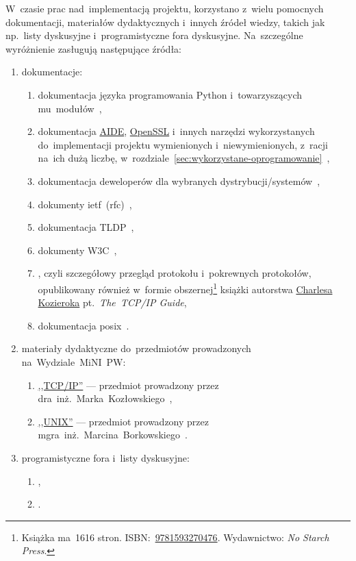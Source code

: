\documentclass[thesis]{subfiles}
\begin{document}
W~czasie prac nad~implementacją projektu, korzystano z~wielu pomocnych dokumentacji, materiałów dydaktycznych i~innych źródeł wiedzy, takich jak np.~listy dyskusyjne i~programistyczne fora dyskusyjne. Na~szczególne wyróżnienie zasługują następujące źródła:\mynobreakpar
\begin{enumerate}
	\item dokumentacje:\mynobreakpar
	\begin{enumerate}
		\item dokumentacja języka  programowania Python i~towarzyszących mu~modułów~\cite{python-doc},%
		\item dokumentacja \hyperref[sec:aide]{AIDE}, \href{https://en.wikipedia.org/wiki/OpenSSL}{OpenSSL} i~innych narzędzi wykorzystanych do~implementacji projektu wymienionych i~niewymienionych, z~racji na~ich dużą liczbę, w~rozdziale~\ref{sec:wykorzystane-oprogramowanie}~\cite{openssl-doc},
		\item dokumentacja deweloperów dla wybranych dystrybucji/systemów~\cite{archlinux-wiki,gentoo-wiki},
		\item dokumenty \gls{ietf}~(\gls{rfc})~\cite{rfc-editor},
		\item dokumentacja TLDP~\cite{tldp},
		\item dokumenty W3C~\cite{w3c},
		\item {}, czyli szczegółowy przegląd protokołu  i~pokrewnych protokołów, opublikowany również w~formie obszernej\footnote{Książka ma~1616 stron. ISBN:~\href{https://www.nostarch.com/tcpip.htm}{9781593270476}. Wydawnictwo: \emph{No Starch Press}.} książki autorstwa \href{https://www.linkedin.com/in/charles-kozierok-708112/}{\mbox{Charlesa} \mbox{Kozieroka}} pt.~\emph{The~TCP/IP Guide},
		\item dokumentacja \gls{posix}~\cite{posix}.
	\end{enumerate}
	\item materiały dydaktyczne do~przedmiotów prowadzonych na~Wydziale~MiNI~PW:\mynobreakpar
	\begin{enumerate}
		\item \href{http://www.mini.pw.edu.pl/~kozlowsm/tcpip}{,,TCP/IP''} --- przedmiot prowadzony przez dra~inż.~Marka~Kozłowskiego~\cite{kozlowski},
		\item \href{http://www.mini.pw.edu.pl/~marcinbo/strona/glowna/unix.html}{,,UNIX''} --- przedmiot prowadzony przez mgra~inż.~Marcina~Borkowskiego~\cite{borkowski}.
	\end{enumerate}
	\item programistyczne fora i~listy dyskusyjne:
	\begin{enumerate}
		\item {},
		\item {}.
	\end{enumerate}
\end{enumerate}
\end{document}
